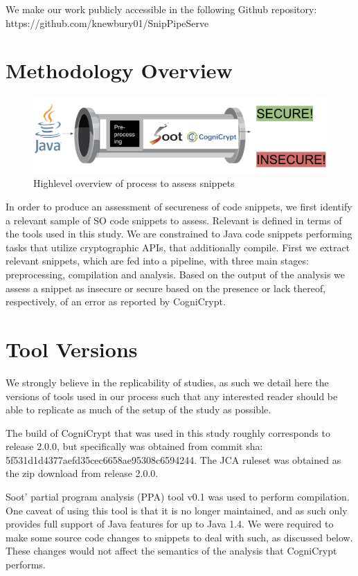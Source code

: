 \documentclass[10pt, conference]{IEEEtran}
\begin{document}
We make our work publicly accessible in the following Github repository:
https://github.com/knewbury01/SnipPipeServe


\section{Methodology Overview}

\begin{figure}[h]
\begin{center}
\includegraphics[width=1.0\linewidth]{pipeline.png}
\caption{Highlevel overview of process to assess snippets}
\end{center}
\end{figure}

In order to produce an assessment of secureness of code snippets, we first identify a relevant sample of SO code snippets to assess. Relevant is defined in terms of the tools used in this study. We are constrained to Java code snippets performing tasks that utilize cryptographic APIs, that additionally compile. First we extract relevant snippets, which are fed into a pipeline, with three main stages: preprocessing, compilation and analysis. Based on the output of the analysis we assess a snippet as insecure or secure based on the presence or lack thereof, respectively, of an error as reported by CogniCrypt.

\section{Tool Versions}

We strongly believe in the replicability of studies, as such we detail here the versions of tools used in our process such that any interested reader should be able to replicate as much of the setup of the study as possible.

The build of CogniCrypt that was used in this study roughly corresponds to release 2.0.0, but specifically was obtained from commit sha: 5f531d1d4377aefd35cec6658ae95308c6594244. The JCA ruleset was obtained as the zip download from release 2.0.0. 

Soot' partial program analysis (PPA) tool v0.1 \cite{SootPPA} was used to perform compilation. One caveat of using this tool is that it is no longer maintained, and as such only provides full support of Java features for up to Java 1.4. We were required to make some source code changes to snippets to deal with such, as discussed below. These changes would not affect the semantics of the analysis that CogniCrypt performs.
\end{document}

